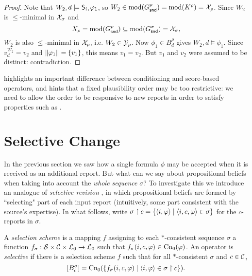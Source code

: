 \begin{proof}
    Note that $W_2, d \models \S_{i_1}{\phi_1}$, so $W_2 \in \mods(G^\rho_\snd)
    = \mods(K^\rho) = \X_\rho$. Since $W_2$ is $\le$-minimal in $\X_\sigma$ and
    \[
        X_\rho = \mods(G^\rho_\snd) \subseteq \mods(G^\sigma_\snd) = \X_\sigma,
    \]
    $W_2$ is also $\le$-minimal in $\X_\rho$, i.e. $W_2 \in \Y_\rho$. Now
    $\phi_1 \in B^\rho_d$ gives $W_2, d \models \phi_1$. Since $v^{W_2}_d =
    v_2$ and $\propmods{\phi_1} = \{v_1\}$, this means $v_1 = v_2$. But $v_1$
    and $v_2$ were assumed to be distinct: contradiction.

\end{proof}

 highlights an important
difference between conditioning and score-based operators, and hints that
a fixed plausibility order may be too restrictive: we
need to allow the order to be responsive to new reports in order to satisfy
properties such as \strongcondsucc{}.

\section{Selective Change}
\label{kr_sec_selective_change}

In the previous section we saw how a single formula $\phi$ may be accepted when
it is received as an additional report. But what can we say about propositional
beliefs when taking into account the \emph{whole sequence} $\sigma$? To
investigate this we introduce an analogue of \emph{selective revision}
\cite{ferme1999selective}, in which propositional beliefs are
formed by ``selecting" part of each input report (intuitively, some part
consistent with the source's expertise). In what follows, write $\sigma \rs c =
\{\tuple{i, \phi} \mid \tuple{i, c, \phi} \in \sigma\}$ for the $c$-reports in
$\sigma$.

\begin{definition}
    \label{kr_def_selectivity}
    A \emph{selection scheme} is a mapping $f$ assigning to each
    $\ast$-consistent sequence $\sigma$ a function $f_\sigma: \srcs \times \C
    \times \lprop \to \lprop$ such that $f_\sigma(i, c, \phi) \in
    \cnprop(\phi)$.
    An operator is \emph{selective} if there is a selection scheme $f$ such
    that for all $\ast$-consistent $\sigma$ and $c \in \C$,
    \[
        \proppart{B^\sigma_c} = \cnprop(\{f_\sigma(i, c, \phi) \mid \tuple{i,
        \phi} \in \sigma \rs c\}).
    \]
\end{definition}

